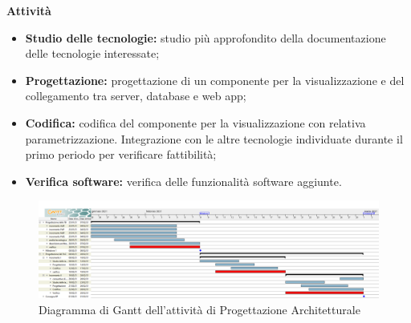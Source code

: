 \textbf{Attività}			

\begin{itemize}

\item \textbf{Studio delle tecnologie:} studio più approfondito della documentazione delle tecnologie interessate; %
\item \textbf{Progettazione:} progettazione di un componente per la visualizzazione  e del collegamento tra server, database e web app;
\item \textbf{Codifica:} codifica del componente per la visualizzazione con relativa parametrizzazione. Integrazione con le altre tecnologie individuate durante il primo periodo per verificare fattibilità;
\item \textbf{Verifica software:} verifica delle funzionalità software aggiunte.
\end{itemize}

\begin{landscape}

\begin{figure}[h]
	\centering	
	\includegraphics[width=\linewidth]{Images/GanttPianificazioneProgettazioneArchitetturale.PNG}
	\caption{Diagramma di Gantt dell'attività di Progettazione Architetturale}
\end{figure}

\end{landscape}



